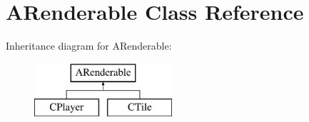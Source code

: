 \hypertarget{classARenderable}{\section{A\-Renderable Class Reference}
\label{classARenderable}
}
Inheritance diagram for A\-Renderable\-:\begin{figure}[H]
\begin{center}
\leavevmode
\includegraphics[height=2.000000cm]{classARenderable}
\end{center}
\end{figure}
